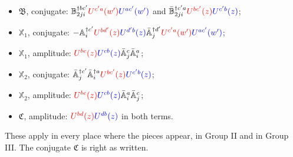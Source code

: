 \documentclass[10pt]{article}
\def\mf#1{\mathbb{#1}}
\newcommand{\old}[1]{{\color{red}#1}}
\newcommand{\new}[1]{{\color{blue}#1}}
\begin{document}
\begin{itemize}
\begin{itemize}
\item $\mathfrak B$, conjugate: $\mf B^{\dagger bc'}_{2ji}\old{U^{c'a}(w')}\new{U^{ac'}(w')}$ and $\bar{\mf B}^{\dagger c'a}_{2ji}\old{U^{bc'}(z)}\new{U^{c'b}(z)}$;
\item $\mathbb X_1$, conjugate: $-\mf A^{\dagger c'}_i\old{U^{bd'}(z)}\new{U^{d'b}(z)}\bar{\mf A}^{\dagger d'}_j\old{U^{c'a}(w')}\new{U^{ac'}(w')}$;
\item $\mathbb X_1$, amplitude: $\old{U^{bc}(z)}\new{U^{cb}(z)}\bar{\mf A}^c_j\bar{\mf A}^a_i$;
\item $\mathbb X_2$, conjugate: $\bar{\mf A}^{\dagger c'}_j\bar{\mf A}^{\dagger a}_i\old{U^{bc'}(z)}\new{U^{c'b}(z)}$;
\item $\mathbb X_2$, amplitude: $\old{U^{bc}(z)}\new{U^{cb}(z)}\bar{\mf A}^a_i\bar{\mf A}^c_j$;
\item $\mathfrak C$, amplitude: $\old{U^{bd}(z)}\new{U^{db}(z)}$ in both terms.
\end{itemize}
These apply in every place where the pieces appear, in Group II and in Group III. The conjugate $\mathfrak C$ is right as written.
\end{itemize}

\end{document}
